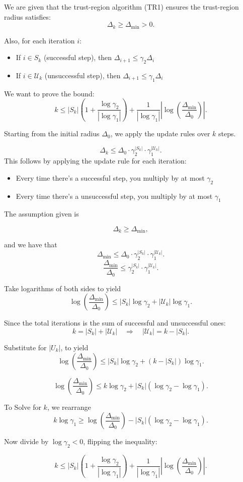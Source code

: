 \documentclass{ExerciseSheet}
\begin{document}
\begin{solution}
    We are given that the trust-region algorithm (TR1) ensures the trust-region radius satisfies:
\[
\Delta_k \geq \Delta_{\min} > 0.
\]

Also, for each iteration $i$:

\begin{itemize}
    \item If $i \in S_k$ (successful step), then $\Delta_{i+1} \leq \gamma_2 \Delta_i$
    \item If $i \in \mathcal{U}_k$ (unsuccessful step), then $\Delta_{i+1} \leq \gamma_1 \Delta_i$
\end{itemize}

We want to prove the bound:
\[
k \leq |S_k| \left(1 + \frac{\log \gamma_2}{|\log \gamma_1|} \right) + \frac{1}{|\log \gamma_1|} \left| \log \left( \frac{\Delta_{\min}}{\Delta_0} \right) \right|. 
\]



Starting from the initial radius $\Delta_0$, we apply the update rules over $k$ steps.

\[
\Delta_k \leq \Delta_0 \cdot \gamma_2^{|S_k|} \cdot \gamma_1^{|\mathcal{U}_k|}.
\]
This follows by applying the update rule for each iteration:
\begin{itemize}
    \item Every time there's a successful step, you multiply by at most $\gamma_2$
\item Every time there's a unsuccessful step, you multiply by at most $\gamma_1$

\end{itemize}

The assumption given is 

\[
\Delta_k \geq \Delta_{\min},
\]

and we have that
\[
\Delta_{\min} \leq \Delta_0 \cdot \gamma_2^{|S_k|} \cdot \gamma_1^{|\mathcal{U}_k|}.
\]
\[
\frac{\Delta_{\min}}{\Delta_0} \leq \gamma_2^{|S_k|} \cdot \gamma_1^{|\mathcal{U}_k|}.
\]

Take logarithms of both sides to yield
\[
\log \left( \frac{\Delta_{\min}}{\Delta_0} \right) \leq |S_k| \log \gamma_2 + |\mathcal{U}_k| \log \gamma_1.
\]

Since the total iterations is the sum of successful and unsuccessful ones:
\[
k = |S_k| + |\mathcal{U}_k| \quad \Rightarrow \quad |\mathcal{U}_k| = k - |S_k|.
\]

Substitute for $|U_k|$, to yield
\[
\log \left( \frac{\Delta_{\min}}{\Delta_0} \right) \leq |S_k| \log \gamma_2 + (k - |S_k|) \log \gamma_1.
\]

\[
\log \left( \frac{\Delta_{\min}}{\Delta_0} \right) \leq k \log \gamma_2 + |S_k| (\log \gamma_2 - \log \gamma_1).
\]

To Solve for $k$, we rearrange 
\[
k \log \gamma_1 \geq \log \left( \frac{\Delta_{\min}}{\Delta_0} \right) - |S_k| (\log \gamma_2 - \log \gamma_1).
\]

Now divide by $\log \gamma_2 < 0$, flipping the inequality:

\[
k \leq |S_k| \left(1 + \frac{\log \gamma_2}{|\log \gamma_1|} \right) + \frac{1}{|\log \gamma_1|} \left| \log \left( \frac{\Delta_{\min}}{\Delta_0} \right) \right|.
\]
\end{solution}
\end{document}
